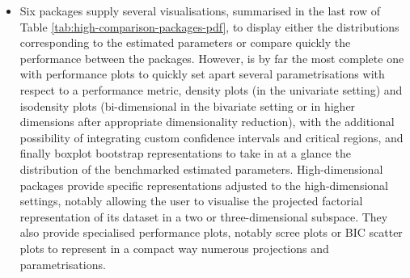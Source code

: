 \begin{itemize}
\tightlist
\item
  Six packages supply several visualisations, summarised in the last row of Table \ref{tab:high-comparison-packages-pdf}, to display either the distributions corresponding to the estimated parameters or compare quickly the performance between the packages. However,  is by far the most complete one with performance plots to quickly set apart several parametrisations with respect to a performance metric, density plots (in the univariate setting) and isodensity plots (bi-dimensional in the bivariate setting or in higher dimensions after appropriate dimensionality reduction), with the additional possibility of integrating custom confidence intervals and critical regions, and finally boxplot bootstrap representations to take in at a glance the distribution of the benchmarked estimated parameters.
  \color{blue}
  High-dimensional packages provide specific representations adjusted to the high-dimensional settings, notably allowing the user to visualise the projected factorial representation of its dataset in a two or three-dimensional subspace. They also provide specialised performance plots, notably scree plots or BIC scatter plots to represent in a compact way numerous projections and parametrisations.
  \color{black}
\end{itemize}

